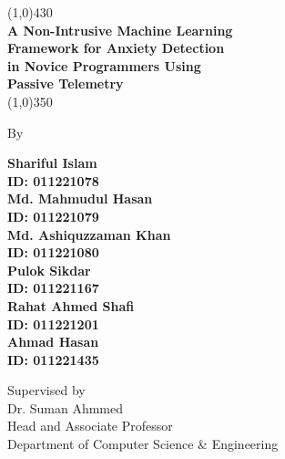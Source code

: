 \begin{titlepage}


\begin{center}
\line(1,0){430}\\
{\Huge \bf A Non-Intrusive Machine Learning \\ 
Framework for Anxiety Detection \\ in 
Novice Programmers Using \\ 
\vspace{.5em} Passive Telemetry } \\
\line(1,0){350}

\end{center}

\vfill

\begin{center}
By
\end{center}

\vfill
\begin{center}





{\large \bf Shariful Islam \\ \vspace{.2} ID: 011221078}\\
{\large \bf Md. Mahmudul Hasan  \\ \vspace{.2} ID: 011221079}\\
{\large \bf Md. Ashiquzzaman Khan \\ \vspace{.2}ID: 011221080}\\
{\large \bf Pulok Sikdar \\ \vspace{.2} ID: 011221167}\\
{\large \bf Rahat Ahmed Shafi \\ \vspace{.2} ID: 011221201}\\
{\large \bf Ahmad Hasan \\ \vspace{.2} ID: 011221435}\\
\end{center}


\vfill


\begin{center}
Supervised by  \\
Dr. Suman Ahmmed \\
Head and Associate Professor \\
Department of Computer Science \& Engineering
\end{center}


\end{titlepage}
